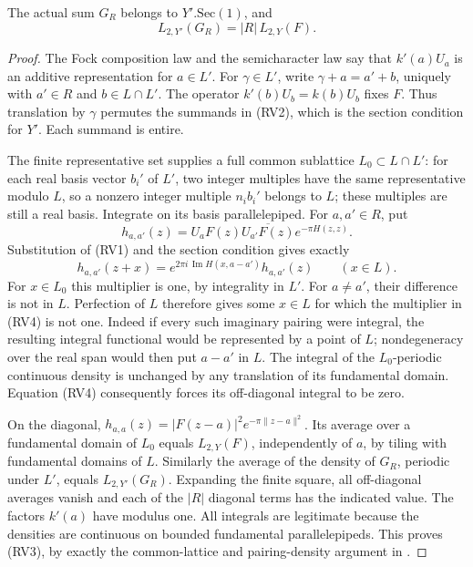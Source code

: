 \begin{srlemma}\label{lem:sr-source-isogeny-sum-norm}
The actual sum \(G_R\) belongs to \(Y'.\mathrm{Sec}(1)\), and
\[
                           L_{2,Y'}(G_R)=|R|\,L_{2,Y}(F).
 \tag{RV3}\label{eq:sr-source-isogeny-sum-norm}
\]
\end{srlemma}
\begin{proof}
The Fock composition law and the semicharacter law say that
\(k'(a)U_a\) is an additive representation for \(a\in L'\).
For \(\gamma\in L'\), write
\(\gamma+a=a'+b\), uniquely with \(a'\in R\) and
\(b\in L\cap L'\).
The operator \(k'(b)U_b=k(b)U_b\) fixes \(F\).
Thus translation by \(\gamma\) permutes the summands in (RV2),
which is the section condition for \(Y'\).
Each summand is entire.

The finite representative set supplies a full common sublattice
\(L_0\subset L\cap L'\): for each real basis vector \(b_i'\)
of \(L'\), two integer multiples have the same representative
modulo \(L\), so a nonzero integer multiple \(n_i b_i'\)
belongs to \(L\); these multiples are still a real basis.
Integrate on its basis parallelepiped.
For \(a,a'\in R\), put
\[
 h_{a,a'}(z)=U_aF(z)\overline{U_{a'}F(z)}e^{-\pi H(z,z)} .
\]
Substitution of (RV1) and the section condition gives exactly
\[
 h_{a,a'}(z+x)
   =e^{2\pi i\,\operatorname{Im}H(x,a-a')}h_{a,a'}(z)
                                             \qquad(x\in L).
 \tag{RV4}\label{eq:sr-source-pairing-density}
\]
For \(x\in L_0\) this multiplier is one, by integrality in \(L'\).
For \(a\ne a'\), their difference is not in \(L\).
Perfection of \(L\) therefore gives some \(x\in L\) for which
the multiplier in (RV4) is not one.
Indeed if every such imaginary pairing were integral,
the resulting integral functional would be represented by
a point of \(L\); nondegeneracy over the real span would then
put \(a-a'\) in \(L\).
The integral of the \(L_0\)-periodic continuous density is
unchanged by any translation of its fundamental domain.
Equation (RV4) consequently forces its off-diagonal integral
to be zero.

On the diagonal,
\(h_{a,a}(z)=|F(z-a)|^2e^{-\pi\|z-a\|^2}\).
Its average over a fundamental domain of \(L_0\) equals
\(L_{2,Y}(F)\), independently of \(a\), by tiling with
fundamental domains of \(L\).
Similarly the average of the density of \(G_R\), periodic
under \(L'\), equals \(L_{2,Y'}(G_R)\).
Expanding the finite square, all off-diagonal averages vanish
and each of the \(|R|\) diagonal terms has the indicated value.
The factors \(k'(a)\) have modulus one.
All integrals are legitimate because the densities are continuous
on bounded fundamental parallelepipeds.
This proves (RV3), by exactly the common-lattice and pairing-density
argument in
.
\end{proof}

